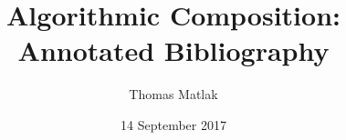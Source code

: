 \documentclass[12pt]{article}
\begin{document}
	
	\title{Algorithmic Composition: Annotated Bibliography}
	\author{Thomas Matlak}
	\date{14 September 2017}
	\maketitle
	
	
	\nocite{*}
	
	
	
\end{document}
